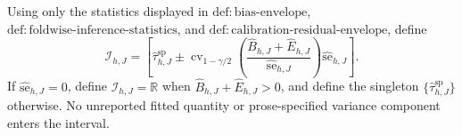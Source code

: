 Using only the statistics displayed in \(\mathrm{def:bias\text{-}envelope}\), \(\mathrm{def:foldwise\text{-}inference\text{-}statistics}\), and \(\mathrm{def:calibration\text{-}residual\text{-}envelope}\), define \[\mathcal I_{h,J}=\left[\widehat\tau^{\mathrm{sp}}_{h,J}\pm\operatorname{cv}_{1-\gamma/2}\!\left(\frac{\widehat B_{h,J}+\widehat E_{h,J}}{\widehat{\mathrm{se}}_{h,J}}\right)\widehat{\mathrm{se}}_{h,J}\right].\] If \(\widehat{\mathrm{se}}_{h,J}=0\), define \(\mathcal I_{h,J}=\mathbb R\) when \(\widehat B_{h,J}+\widehat E_{h,J}>0\), and define the singleton \(\{\widehat\tau^{\mathrm{sp}}_{h,J}\}\) otherwise. No unreported fitted quantity or prose-specified variance component enters the interval.
